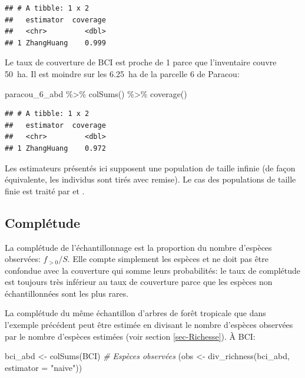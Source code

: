 \documentclass[
  11pt,
  american,
  a4paper,
  extrafontsizes,onecolumn,openright
  ]{memoir}
\newenvironment{Shaded}{\begin{snugshade}}{\end{snugshade}}
\newcommand{\AttributeTok}[1]{\textcolor[rgb]{0.77,0.63,0.00}{#1}}
\newcommand{\CommentTok}[1]{\textcolor[rgb]{0.56,0.35,0.01}{\textit{#1}}}
\newcommand{\FunctionTok}[1]{\textcolor[rgb]{0.00,0.00,0.00}{#1}}
\newcommand{\NormalTok}[1]{#1}
\newcommand{\OtherTok}[1]{\textcolor[rgb]{0.56,0.35,0.01}{#1}}
\newcommand{\SpecialCharTok}[1]{\textcolor[rgb]{0.00,0.00,0.00}{#1}}
\newcommand{\StringTok}[1]{\textcolor[rgb]{0.31,0.60,0.02}{#1}}
\begin{document}
\begin{verbatim}
## # A tibble: 1 x 2
##   estimator  coverage
##   <chr>         <dbl>
## 1 ZhangHuang    0.999
\end{verbatim}

\normalsize

Le taux de couverture de BCI est proche de 1 parce que l'inventaire couvre 50~ha.
Il est moindre sur les 6.25~ha de la parcelle 6 de Paracou:

\scriptsize

\begin{Shaded}
\begin{Highlighting}[]
\NormalTok{paracou\_6\_abd }\SpecialCharTok{\%\textgreater{}\%} 
  \FunctionTok{colSums}\NormalTok{() }\SpecialCharTok{\%\textgreater{}\%} 
  \FunctionTok{coverage}\NormalTok{()}
\end{Highlighting}
\end{Shaded}

\begin{verbatim}
## # A tibble: 1 x 2
##   estimator  coverage
##   <chr>         <dbl>
## 1 ZhangHuang    0.972
\end{verbatim}

\normalsize

Les estimateurs présentés ici supposent une population de taille infinie (de façon équivalente, les individus sont tirés avec remise).
Le cas des populations de taille finie est traité par \textcite{Chao2012} et \textcite{Hwang2014}.

\hypertarget{compluxe9tude}{%
\subsection{Complétude}\label{compluxe9tude}}

La complétude de l'échantillonnage est la proportion du nombre d'espèces observées: \(f_{>0} / S\).
Elle compte simplement les espèces et ne doit pas être confondue avec la couverture qui somme leurs probabilités: le taux de complétude est toujours très inférieur au taux de couverture parce que les espèces non échantillonnées sont les plus rares.

La complétude du même échantillon d'arbres de forêt tropicale que dans l'exemple précédent peut être estimée en divisant le nombre d'espèces observées par le nombre d'espèces estimées (voir section \ref{sec-Richesse}).
À BCI:

\scriptsize

\begin{Shaded}
\begin{Highlighting}[]
\NormalTok{bci\_abd }\OtherTok{\textless{}{-}} \FunctionTok{colSums}\NormalTok{(BCI)}
\CommentTok{\# Espèces observées}
\NormalTok{(obs }\OtherTok{\textless{}{-}} \FunctionTok{div\_richness}\NormalTok{(bci\_abd, }\AttributeTok{estimator  =} \StringTok{"naive"}\NormalTok{))}
\end{Highlighting}
\end{Shaded}
\end{document}
